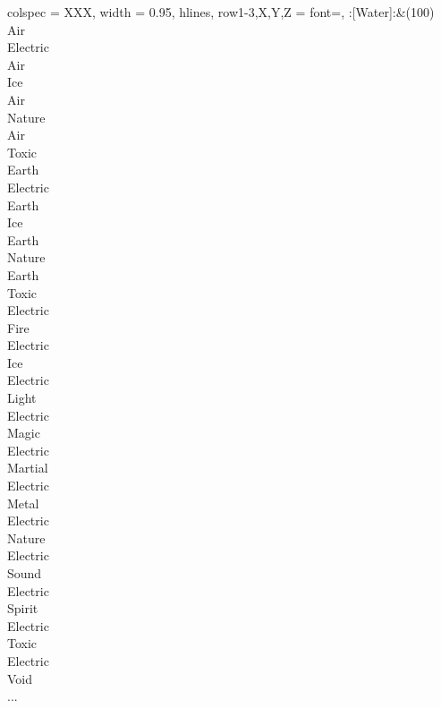 \begin{longtblr}[
	caption = {2v1 Defending Weak},
	label = {2v1-Defending-Weak},
]{
	colspec = {XXX}, width = 0.95\linewidth,
	hlines,
	row{1-3,X,Y,Z} = {font=\bfseries},
}
	:[Water]:&{(100)\\
	Air \\
	Electric \\
	Air \\
	Ice \\
	Air \\
	Nature \\
	Air \\
	Toxic \\
	Earth \\
	Electric \\
	Earth \\
	Ice \\
	Earth \\
	Nature \\
	Earth \\
	Toxic \\
	Electric \\
	Fire \\
	Electric \\
	Ice \\
	Electric \\
	Light \\
	Electric \\
	Magic \\
	Electric \\
	Martial \\
	Electric \\
	Metal \\
	Electric \\
	Nature \\
	Electric \\
	Sound \\
	Electric \\
	Spirit \\
	Electric \\
	Toxic \\
	Electric \\
	Void \\
	...\\
	}\\


\end{longtblr}
